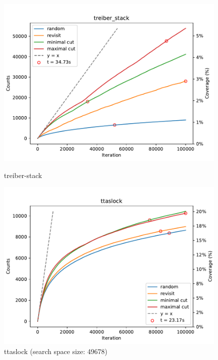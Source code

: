 \begin{figure}[h!]
	\begin{minipage}{0.45\textwidth}
		\centering
		\includegraphics[width=\textwidth]{figure/genmc/treiber_stack.pdf}
		\caption{treiber-stack}
		\label{genmc:treiber_stack (search space size: 961851)}
	\end{minipage}
	\hfill
	\begin{minipage}{0.45\textwidth}
		\centering
		\includegraphics[width=\textwidth]{figure/genmc/ttaslock.pdf}
		\caption{ttaslock (search space size: 49678)}
		\label{genmc:ttaslock}
	\end{minipage}

\end{figure}




